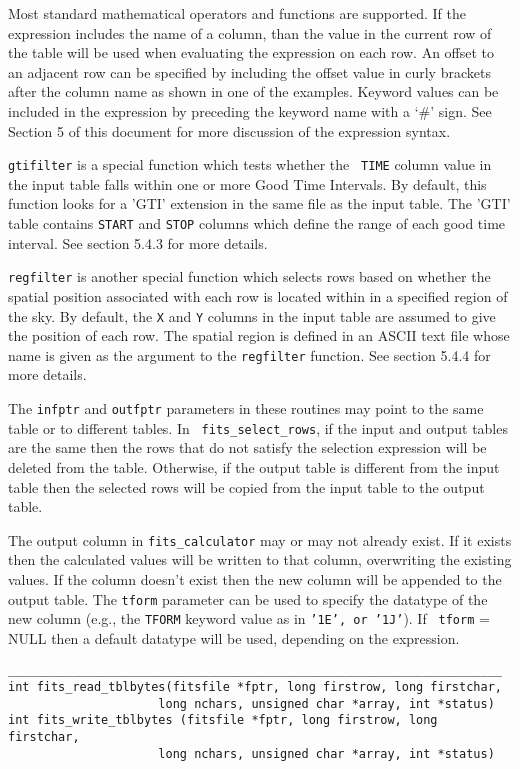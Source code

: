 \documentclass[11pt]{article}
\begin{document}
Most standard mathematical operators and functions are supported.  If
the expression includes the name of a column, than the value in the
current row of the table will be used when evaluating the expression on
each row.   An offset to an adjacent row can be specified by including
the offset value in curly brackets after the column name as shown in
one of the examples.  Keyword values can be included in the expression
by preceding the keyword name with a `\#' sign.   See Section 5 of this
document for more discussion of the expression syntax.

{\tt gtifilter} is a special function which tests whether the {\tt
TIME} column value in the input table falls within one or more Good
Time Intervals.  By default, this function looks for a 'GTI' extension
in the same file as the input table.  The 'GTI' table contains {\tt START} 
and {\tt STOP} columns which define the range of
each good time interval. See section 5.4.3 for more details.

{\tt regfilter} is another special function which selects rows based on
whether the spatial position associated with each row is located within
in a specified region of the sky.  By default, the {\tt X} and {\tt Y}
columns in the input table are assumed to give the position of each row.
The spatial region is defined in an ASCII text file whose name is given
as the argument to the {\tt regfilter} function. See section 5.4.4 for
more details.

The {\tt infptr} and {\tt outfptr} parameters in these routines may
point to the same table or to different tables.  In {\tt
fits\_select\_rows}, if the input and output tables are the same then
the rows that do not satisfy the selection expression will be deleted
from the table.  Otherwise, if the output table is different from the
input table then the selected rows will be copied from the input table
to the output table.

The output column in {\tt fits\_calculator} may or may not already
exist.  If it exists then the calculated values will be written to that
column, overwriting the existing values.  If the column doesn't exist
then the new column will be appended to the output table. The {\tt tform}
parameter can be used to specify the datatype of the new column (e.g.,
the {\tt TFORM} keyword value as in {\tt '1E', or '1J'}). If {\tt
tform} = NULL then a default datatype will be used, depending on the
expression.

\begin{verbatim}
_____________________________________________________________________
int fits_read_tblbytes(fitsfile *fptr, long firstrow, long firstchar,
                     long nchars, unsigned char *array, int *status)
int fits_write_tblbytes (fitsfile *fptr, long firstrow, long firstchar,
                     long nchars, unsigned char *array, int *status)
\end{verbatim}
\end{document}
